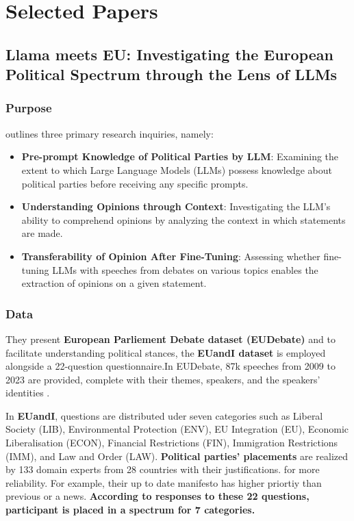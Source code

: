 \section{Selected Papers}
\subsection{Llama meets EU: Investigating the European Political Spectrum through the Lens of LLMs}

\subsubsection{Purpose}
\cite[This research paper]{chalkidis2024llama} outlines three primary research inquiries, namely:
\begin{itemize}
    \item \textbf{Pre-prompt Knowledge of Political Parties by LLM}: Examining 
    the extent to which Large Language Models (LLMs) possess knowledge 
    about political parties before receiving any specific prompts. 
    \item \textbf{Understanding Opinions through Context}: Investigating 
    the LLM's ability to comprehend opinions by analyzing the 
    context in which statements are made.
    \item \textbf{Transferability of Opinion After Fine-Tuning}: 
    Assessing whether fine-tuning LLMs with speeches from 
    debates on various topics enables the extraction of opinions 
    on a given statement.
\end{itemize} 

\subsubsection{Data}

They present \textbf{European Parliement Debate dataset (EUDebate)} and to facilitate understanding political stances, the \textbf{EUandI dataset} is employed alongside a 22-question questionnaire.In EUDebate, 87k speeches from 2009 to 2023 are provided, complete with their themes, speakers, and the speakers' identities \cite{michel2019euandi2019}. 

In \textbf{EUandI}, questions are distributed uder seven categories such as Liberal Society (LIB), Environmental Protection (ENV), EU Integration (EU), Economic Liberalisation (ECON), Financial Restrictions (FIN), Immigration Restrictions (IMM), and Law and Order (LAW). \textbf{Political parties' placements} are realized by 133 domain experts from 28 countries with their justifications.  for more reliability. For example, their up to date manifesto has higher priortiy than previous or a news. \textbf{According to responses to these 22 questions, participant is placed in a spectrum for 7 categories.}


